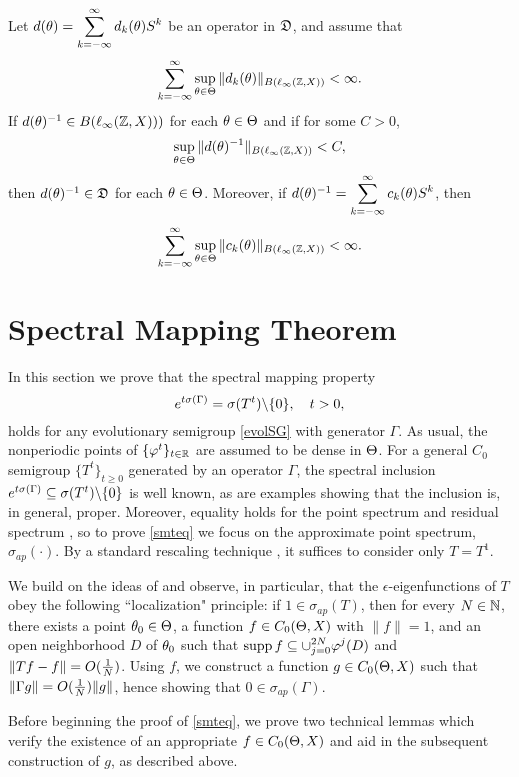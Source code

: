 \begin{prop}
Let $\displaystyle{d(\theta)=\sum_{k=-\infty}^\infty d_k(\theta)S^k}$ be an operator in ${\frak{D}}$,
and assume that
\[\displaystyle\sum_{k=-\infty}^\infty\sup\sb{\theta\in \Theta}\|d_k(\theta)\|_{B(\ell_\infty({\Bbb{Z}},X))} <
\infty.\] If $d(\theta)^{-1}\in B(\ell_\infty({\Bbb{Z}},X)))$ for each $\theta\in \Theta$
and if for some $C>0$,
$$
\sup\sb{\theta\in \Theta} \|d(\theta)^{-1} \|_{B(\ell_\infty({\Bbb{Z}},X))} < C,
$$
then $d(\theta)^{-1} \in {\frak{D}}$ for each $\theta\in \Theta$.  Moreover, if
$d(\theta)^{-1}= \displaystyle\sum_{k=-\infty}^\infty c_k(\theta)S^k$, then
$$\sum_{k=-\infty}^\infty \sup\sb{\theta\in \Theta}
\| c_k(\theta)\|_{B(\ell_\infty({\Bbb{Z}},X))} < \infty.$$
\end{prop}





\section{Spectral Mapping Theorem}
\setcounter{equation}{0}

In this section we prove that the spectral mapping property
\begin{equation}\lb{smteq}
e^{t\sigma(\Gamma)}=\sigma(T^t)\bs \{0\},\quad t>0,
\end{equation}
holds for any evolutionary semigroup \eqref{evolSG} with
generator $\Gamma$.
As usual, the nonperiodic points of $\{\varphi^t\}_{t\in{\Bbb{R}}}$
are assumed to be dense in $\Theta$.  For a general $C_0$ semigroup
$\{T^t\}_{t\ge0}$ generated by an operator $\Gamma$,
the spectral inclusion
$e^{t\sigma(\Gamma)}\subseteq \sigma(T^t)\backslash \{0\}$
is well known, as are examples showing that the inclusion is,
in general, proper.  Moreover, equality holds for the point
spectrum and residual spectrum \cite{Nag}, so to prove
\eqref{smteq} we focus on the approximate point spectrum,
$\sigma_{ap}(\cdot)$.
By a standard rescaling technique \cite{Nag},
it suffices to consider only $T=T^1$.

We build on the ideas of \cite{Mather} and observe, in particular,
that the $\epsilon$-eigenfunctions of $T$ obey the following
``localization" principle:  if $1\in\sigma_{ap}(T)$, then for every
$N\in{\Bbb{N}}$, there exists a point $\theta_0\in \Theta$, a function
$f\in C_0(\Theta,X)$ with $\|f\|=1$, and an open neighborhood $D$
of $\theta_0$ such that $\displaystyle{
\operatorname{supp}f\subseteq\cup_{j=0}^{2N} \varphi^j(D) }$
and $\|Tf-f\|=O({1\over N})$.  Using $f$, we construct a function
$g\in C_0(\Theta,X)$ such that $\|\Gamma g\|=O({1\over N})\|g\|$, hence
showing that $0\in\sigma_{ap}(\Gamma)$.

Before beginning the proof of \eqref{smteq}, we prove two
technical lemmas which verify the existence of an appropriate
$f\in C_0(\Theta,X)$ and aid in the subsequent construction of $g$,
as described above.

